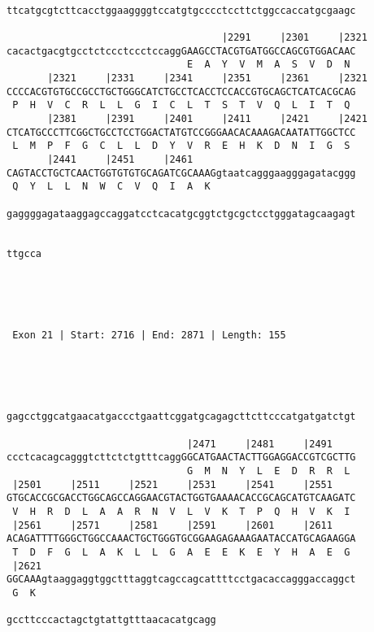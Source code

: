 \documentclass{article}
\begin{document}
\begin{Verbatim}
                                                            
ttcatgcgtcttcacctggaaggggtccatgtgcccctccttctggccaccatgcgaagc
                                                            
                                     |2291     |2301     |2321
cacactgacgtgcctctccctccctccaggGAAGCCTACGTGATGGCCAGCGTGGACAAC
                               E  A  Y  V  M  A  S  V  D  N 
       |2321     |2331     |2341     |2351     |2361     |2321
CCCCACGTGTGCCGCCTGCTGGGCATCTGCCTCACCTCCACCGTGCAGCTCATCACGCAG
 P  H  V  C  R  L  L  G  I  C  L  T  S  T  V  Q  L  I  T  Q 
       |2381     |2391     |2401     |2411     |2421     |2421
CTCATGCCCTTCGGCTGCCTCCTGGACTATGTCCGGGAACACAAAGACAATATTGGCTCC
 L  M  P  F  G  C  L  L  D  Y  V  R  E  H  K  D  N  I  G  S 
       |2441     |2451     |2461                            
CAGTACCTGCTCAACTGGTGTGTGCAGATCGCAAAGgtaatcagggaagggagatacggg
 Q  Y  L  L  N  W  C  V  Q  I  A  K                         
                                                            
gaggggagataaggagccaggatcctcacatgcggtctgcgctcctgggatagcaagagt
                                                            
      
ttgcca
      




 Exon 21 | Start: 2716 | End: 2871 | Length: 155 




                                                            
gagcctggcatgaacatgaccctgaattcggatgcagagcttcttcccatgatgatctgt
                                                            
                               |2471     |2481     |2491    
ccctcacagcagggtcttctctgtttcaggGGCATGAACTACTTGGAGGACCGTCGCTTG
                               G  M  N  Y  L  E  D  R  R  L 
 |2501     |2511     |2521     |2531     |2541     |2551    
GTGCACCGCGACCTGGCAGCCAGGAACGTACTGGTGAAAACACCGCAGCATGTCAAGATC
 V  H  R  D  L  A  A  R  N  V  L  V  K  T  P  Q  H  V  K  I 
 |2561     |2571     |2581     |2591     |2601     |2611    
ACAGATTTTGGGCTGGCCAAACTGCTGGGTGCGGAAGAGAAAGAATACCATGCAGAAGGA
 T  D  F  G  L  A  K  L  L  G  A  E  E  K  E  Y  H  A  E  G 
 |2621                                                      
GGCAAAgtaaggaggtggctttaggtcagccagcattttcctgacaccagggaccaggct
 G  K                                                       
                                    
gccttcccactagctgtattgtttaacacatgcagg
                                    





\end{Verbatim}
\end{document}
